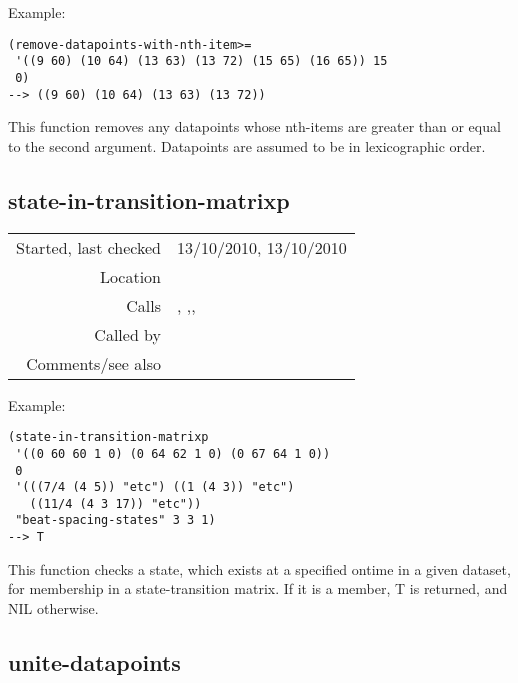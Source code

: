 \vspace{0.5cm}
\noindent Example:
\begin{verbatim}
(remove-datapoints-with-nth-item>=
 '((9 60) (10 64) (13 63) (13 72) (15 65) (16 65)) 15
 0)
--> ((9 60) (10 64) (13 63) (13 72))
\end{verbatim}

This function removes any datapoints whose nth-items
are greater than or equal to the second argument.
Datapoints are assumed to be in lexicographic
order.


\subsection*{state-in-transition-matrixp}\label{fun:state-in-transition-matrixp}

\vspace{0.3cm}
\begin{tabular}{r|p{8cm}}
Started, last checked & 13/10/2010, 13/10/2010 \\
Location & \nameref{sec:generating-beat-MNN-spacing-for-and-back} \\
Calls & \nameref{fun:beat-spacing-states}, \nameref{fun:nth-list-of-lists},\newline \nameref{fun:segments-strict}, \nameref{fun:spacing-holding-states} \\
Called by & \nameref{fun:keys-of-states-in-transition-matrix} \\
Comments/see also &
\end{tabular}

\vspace{0.5cm}
\noindent Example:
\begin{verbatim}
(state-in-transition-matrixp
 '((0 60 60 1 0) (0 64 62 1 0) (0 67 64 1 0))
 0
 '(((7/4 (4 5)) "etc") ((1 (4 3)) "etc")
   ((11/4 (4 3 17)) "etc"))
 "beat-spacing-states" 3 3 1)
--> T
\end{verbatim}

\noindent This function checks a state, which exists
at a specified ontime in a given dataset, for
membership in a state-transition matrix. If it is a
member, T is returned, and NIL otherwise.


\subsection*{unite-datapoints}\label{fun:unite-datapoints}

